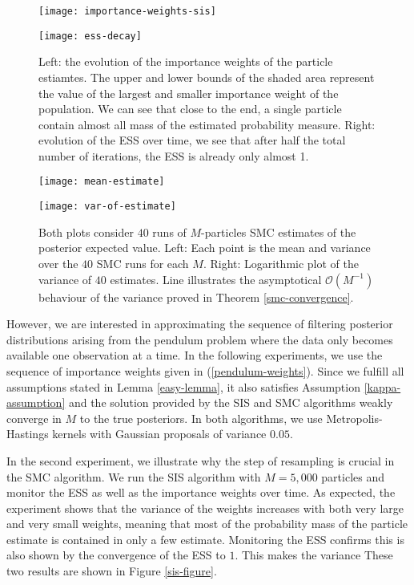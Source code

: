 \begin{figure}[htbp]
  \begin{minipage}{.5\textwidth}
    \texttt{[image: importance-weights-sis]}
  \end{minipage}
  \begin{minipage}{.5\textwidth}
    \texttt{[image: ess-decay]}
  \end{minipage}
  \caption{Left: the evolution of the importance weights of the particle estiamtes. The upper and lower bounds of the shaded area represent the value of the largest and smaller importance weight of the population. We can see that close to the end, a single particle contain almost all mass of the estimated probability measure. Right: evolution of the ESS over time, we see that after half the total number of iterations, the ESS is already only almost 1.}\label{sis-figure}

  \bigskip
  
  \begin{minipage}{.5\textwidth}
    \texttt{[image: mean-estimate]}
  \end{minipage}
  \begin{minipage}{.5\textwidth}
    \texttt{[image: var-of-estimate]}
  \end{minipage}
  \caption{Both plots consider $40$ runs of $M$-particles SMC estimates of the posterior expected value. Left: Each point is the mean and variance over the $40$ SMC runs for each $M$. Right: Logarithmic plot of the variance of $40$ estimates. Line illustrates the asymptotical $\mathcal{O}(M^{-1})$ behaviour of the variance proved in Theorem \ref{smc-convergence}. }\label{smc-figure}
\end{figure}


However, we are interested in approximating the sequence of filtering posterior distributions arising from the pendulum problem where the data only becomes available one observation at a time. In the following experiments, we use the sequence of importance weights given in (\ref{pendulum-weights}). Since we fulfill all assumptions stated in Lemma \ref{easy-lemma}, it also satisfies Assumption \ref{kappa-assumption} and the solution provided by the SIS and SMC algorithms weakly converge in $M$ to the true posteriors. In both algorithms, we use Metropolis-Hastings kernels with Gaussian proposals of variance $0.05$. 

In the second experiment, we illustrate why the step of resampling is crucial in the SMC algorithm. We run the SIS algorithm with $M=5,000$ particles and monitor the ESS as well as the importance weights over time. As expected, the experiment shows that the variance of the weights increases with both very large and very small weights, meaning that most of the probability mass of the particle estimate is contained in only a few estimate. Monitoring the ESS confirms this is also shown by the convergence of the ESS to $1$. This makes the variance These two results are shown in Figure \ref{sis-figure}.

